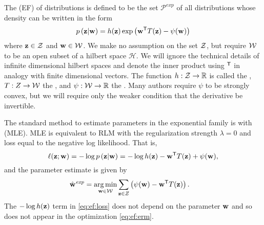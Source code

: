 \documentclass[thesis.tex]{subfiles}
\newcommand{\set}[1]{\mathcal {#1}}
\newcommand{\p}[1]{p\left({#1}\right)}
\newcommand{\wexp}{\hat\w^\textit{exp}}
\newcommand{\Pdist}{\mathcal P}
\newcommand{\Pexp}{\Pdist^\textit{exp}}
\begin{document}
The  (EF) of distributions is defined to be the set $\Pexp$ of all distributions whose density can be written in the form
\begin{equation}
    \p{\z | \w} = h(\z)\exp\left(\trans{\w} T(\z) - \psi(\w)\right)
\end{equation}
where $\mathbf z\in{\mathcal Z}$ and $\mathbf w\in{\mathcal W}$.
We make no assumption on the set ${\mathcal Z}$, but require ${\mathcal W}$ to be an open subset of a hilbert space $\set H$.
We will ignore the technical details of infinite dimensional hilbert spaces and denote the inner product using ${}^{\mathsf{T}}$ in analogy with finite dimensional vectors.
The function $h : {\mathcal Z}\to\mathbb R$ is called the ,
$T : Z \to {\mathcal W}$ the ,
and $\psi : {\mathcal W} \to \mathbb R$ the .
Many authors require $\psi$ to be strongly convex,
but we will require only the weaker condition that the derivative be invertible.

The standard method to estimate parameters in the exponential family is with  (MLE).
MLE is equivalent to RLM with the regularization strength $\lambda=0$ and loss equal to the negative log likelihood.
That is,
\begin{equation}
    \label{eq:ef:loss}
    \loss(\z;\w) 
    = -\log\p{\z|\w}
    = -\log h(\z) - \trans\w T(\z) + \psi(\w)
    ,
\end{equation}
and the parameter estimate is given by
\newcommand{\deriv}[2]{\frac{\dd {#1}}{\dd {#2}}}
\begin{align}
    \label{eq:ef:erm}
    \wexp
    &= \argmin_{\w\in\W} \sum_{\z\in Z}\left( \psi(\w) - \trans\w T(\z)\right)
    .
\end{align}
The $-\log h(\mathbf z)$ term in \eqref{eq:ef:loss} does not depend on the parameter $\mathbf w$ and so does not appear in the optimization \eqref{eq:ef:erm}.
\end{document}
